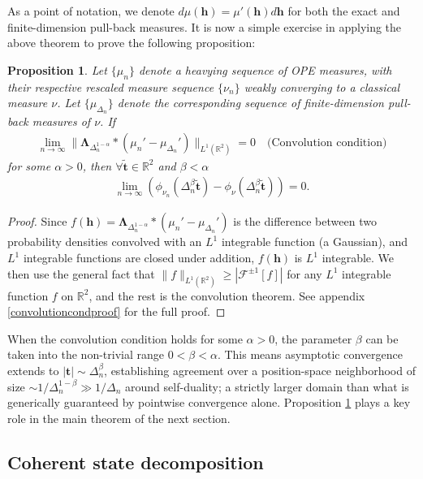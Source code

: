 \documentclass[a4paper,11pt]{article}
\theoremstyle{plain}
\newtheorem{prop}[thm]{Proposition}
\theoremstyle{definition}
\theoremstyle{remark}
\newcommand{\bs}[1]{\boldsymbol{#1}}
\newcommand{\ba}{\begin{equation} \begin{aligned}}
\newcommand{\ea}{\end{aligned} \end{equation}}
\newcommand{\De}{\Delta}
\begin{document}
\noindent As a point of notation, we denote $d\mu(\bs{h}) = \mu'(\bs{h})d\bs{h}$ for both the exact and finite-dimension pull-back measures. It is now a simple exercise in applying the above theorem to prove the following proposition:
\begin{prop}
\label{convolutioncond}
Let $\{\mu_n\}$ denote a heavying sequence of OPE measures, with their respective rescaled measure sequence $\{\nu_n\}$ weakly converging to a classical measure $\nu$. Let $\{\mu_{\De_n}\}$ denote the corresponding sequence of finite-dimension pull-back measures of $\nu$. If 
\ba
\lim_{n\to \infty}\| \bs{\Lambda}_{\De_n^{1-\alpha}} *(\mu_n' - \mu_{\De_n}')\|_{L^1(\mathbb{R}^2)} = 0 \quad \text{(Convolution condition)}
\ea
for some $\alpha>0$, then $\forall \tilde{\bs{t}} \in \mathbb{R}^2$ and $\beta < \alpha$
\ba
\label{pointwiseasymptoticconvergence}
\lim_{n \to \infty} \left( \phi_{\nu_n}(\De_n^{\beta} \tilde{\bs{t}}) -  \phi_{\nu}(\De_n^{\beta} \tilde{\bs{t}}) \right)  = 0.
\ea
\end{prop}

\begin{proof}
Since $f(\bs{h})= \bs{\Lambda}_{\De_n^{1-\alpha}} *(\mu_n' - \mu_{\De_n}')$ is the difference between two probability densities convolved with an $L^1$ integrable function (a Gaussian), and $L^1$ integrable functions are closed under addition, $f(\bs{h})$ is $L^1$ integrable. We then use the general fact that $\| f\|_{L^1(\mathbb{R}^2)} \geq | \mathcal{F}^{\pm1}[f]|$ for any $L^1$ integrable function $f$ on $\mathbb{R}^2$, and the rest is the convolution theorem. See appendix \ref{convolutioncondproof} for the full proof.
\end{proof}

When the convolution condition holds for some $\alpha > 0$, the parameter $\beta$ can be taken into the non-trivial range $0 < \beta <\alpha$. This means asymptotic convergence extends to $|\bs{t}| \sim \De_n^{\beta}$, establishing agreement over a position-space neighborhood of size $\sim 1/\De_n^{1-\beta} \gg 1/\De_n$ around self-duality; a strictly larger domain than what is generically guaranteed by pointwise convergence alone. Proposition \ref{convolutioncond} plays a key role in the main theorem of the next section.


\subsection{Coherent state decomposition}
\label{coherentstatedecomp}
\end{document}
